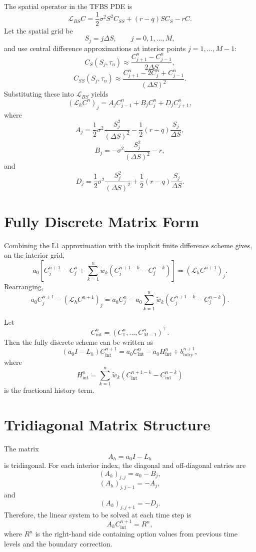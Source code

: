 \documentclass[11pt,a4paper]{report}
\begin{document}
The spatial operator in the TFBS PDE is
\[
\mathcal{L}_{BS}C
=
\frac{1}{2}\sigma^2S^2C_{SS}
+
(r-q)SC_S
-
rC.
\]
Let the spatial grid be
\[
S_j=j\Delta S,
\qquad j=0,1,\dots,M,
\]
and use central difference approximations at interior points $j=1,\dots,M-1$:
\[
C_S(S_j,\tau_n)
\approx
\frac{C_{j+1}^n-C_{j-1}^n}{2\Delta S},
\]
\[
C_{SS}(S_j,\tau_n)
\approx
\frac{C_{j+1}^n-2C_j^n+C_{j-1}^n}{(\Delta S)^2}.
\]
Substituting these into $\mathcal{L}_{BS}$ yields
\[
(\mathcal{L}_hC^n)_j
=
A_jC_{j-1}^n
+
B_jC_j^n
+
D_jC_{j+1}^n,
\]
where
\[
A_j
=
\frac{1}{2}\sigma^2\frac{S_j^2}{(\Delta S)^2}
-
\frac{1}{2}(r-q)\frac{S_j}{\Delta S},
\]
\[
B_j
=
-\sigma^2\frac{S_j^2}{(\Delta S)^2}
-
r,
\]
and
\[
D_j
=
\frac{1}{2}\sigma^2\frac{S_j^2}{(\Delta S)^2}
+
\frac{1}{2}(r-q)\frac{S_j}{\Delta S}.
\]

\section{Fully Discrete Matrix Form}

Combining the L1 approximation with the implicit finite difference scheme gives, on the interior grid,
\[
a_0
\left[
C_j^{n+1}-C_j^n
+
\sum_{k=1}^{n}
\widetilde w_k
\left(
C_j^{n+1-k}-C_j^{n-k}
\right)
\right]
=
(\mathcal{L}_hC^{n+1})_j.
\]
Rearranging,
\[
a_0C_j^{n+1}
-
(\mathcal{L}_hC^{n+1})_j
=
a_0C_j^n
-
a_0
\sum_{k=1}^{n}
\widetilde w_k
\left(
C_j^{n+1-k}-C_j^{n-k}
\right).
\]

Let
\[
C_{\mathrm{int}}^n
=
(C_1^n,\dots,C_{M-1}^n)^\top.
\]
Then the fully discrete scheme can be written as
\[
(a_0I-L_h)C_{\mathrm{int}}^{n+1}
=
a_0C_{\mathrm{int}}^n
-
a_0H_{\mathrm{int}}^n
+
b_{\mathrm{bdry}}^{n+1},
\]
where
\[
H_{\mathrm{int}}^n
=
\sum_{k=1}^{n}
\widetilde w_k
\left(
C_{\mathrm{int}}^{n+1-k}
-
C_{\mathrm{int}}^{n-k}
\right)
\]
is the fractional history term.

\section{Tridiagonal Matrix Structure}

The matrix
\[
A_h=a_0I-L_h
\]
is tridiagonal. For each interior index, the diagonal and off-diagonal entries are
\[
(A_h)_{j,j}
=
a_0-B_j,
\]
\[
(A_h)_{j,j-1}
=
-A_j,
\]
and
\[
(A_h)_{j,j+1}
=
-D_j.
\]
Therefore, the linear system to be solved at each time step is
\[
A_hC_{\mathrm{int}}^{n+1}
=
R^n,
\]
where $R^n$ is the right-hand side containing option values from previous time levels and the boundary correction.
\end{document}
